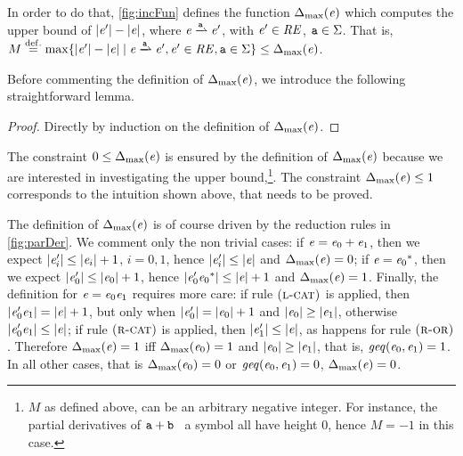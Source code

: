 In order to do that, \cref{fig:incFun} defines the function ${\Delta_{\max}}({\mathit {e}})$ which computes the upper bound of ${\mid}{\mathit {e}'}{\mid}-{\mid}{\mathit {e}}{\mid}$, where
$\re\parDer{\sym}\re'$, with $\mathit {e}'\in\mathit {RE}$, $\mathtt {a}\in\Sigma$.
That is, $M\stackrel{\mathrm{def.}}{=}\max\{\theight{\re'}-\theight{\re} \mid \re\parDer{\sym}\re', \re'\in\reSet, \sym\in\symAlph\}\leq\incFun{\re}$.

Before commenting the definition of ${\Delta_{\max}}({\mathit {e}})$, we introduce the following straightforward lemma.
\begin{proof}
 Directly by induction on the definition of ${\Delta_{\max}}({\mathit {e}})$.
\end{proof}

The constraint $0\leq{\Delta_{\max}}({\mathit {e}})$ is ensured by the definition of ${\Delta_{\max}}({\mathit {e}})$ because we are interested in investigating the upper bound,\footnote{$M$ as defined above, can be an arbitrary negative integer. For instance, the partial derivatives of $\mathtt {a}\mathbin{+}\mathtt {b}$ \wrt~a symbol all have height 0, hence $M=-1$ in this case.}. The constraint ${\Delta_{\max}}({\mathit {e}})\leq 1$ corresponds to the intuition shown above, that needs to be proved.

The definition of ${\Delta_{\max}}({\mathit {e}})$ is of course driven by the reduction rules in \cref{fig:parDer}. We comment only the non trivial cases: if $\mathit {e}=\mathit {e}_0\mathbin{+}\mathit {e}_1$, then we expect ${\mid}{\mathit {e}'_i}{\mid}\leq{\mid}{\ensuremath{\mathit {e}}_i}{\mid}+1$, $i=0,1$,
hence ${\mid}{\mathit {e}'_i}{\mid}\leq{\mid}{\ensuremath{\mathit {e}}}{\mid}$ and ${\Delta_{\max}}({\mathit {e}})=0$;
if $\mathit {e}={\mathit {e}_0}^*$, then we expect ${\mid}{\mathit {e}'_0}{\mid}\leq{\mid}{\ensuremath{\mathit {e}}_0}{\mid}+1$,
hence ${\mid}{\mathit {e}'_0{\mathit {e}_0}^*}{\mid}\leq{\mid}{\ensuremath{\mathit {e}}}{\mid}+1$ and ${\Delta_{\max}}({\mathit {e}})=1$. Finally, the definition for $\mathit {e}=\mathit {e}_0\mathit {e}_1$ requires more care:
if rule $\textsc{({l-cat})}$ is applied, then ${\mid}{\mathit {e}_0'\mathit {e}_1}{\mid}={\mid}{\mathit {e}}{\mid}+1$, but only when ${\mid}{\mathit {e}_0'}{\mid}={\mid}{\mathit {e}_0}{\mid}+1$ and ${\mid}{\mathit {e}_0}{\mid}\geq{\mid}{\ensuremath{\mathit {e}}_1}{\mid}$, otherwise ${\mid}{\mathit {e}_0'\mathit {e}_1}{\mid}\leq{\mid}{\ensuremath{\mathit {e}}}{\mid}$; if rule $\textsc{({r-cat})}$ is applied, then ${\mid}{\mathit {e}'_1}{\mid}\leq{\mid}{\ensuremath{\mathit {e}}}{\mid}$, as happens for rule $\textsc{({r-or})}$. Therefore ${\Delta_{\max}}({\mathit {e}})=1$ iff ${\Delta_{\max}}({\mathit {e}_0})=1$ and ${\mid}{\mathit {e}_0}{\mid}\geq{\mid}{\ensuremath{\mathit {e}}_1}{\mid}$, that is, $\mathit{geq}({\mathit {e}_0},{\mathit {e}_1})=1$. In all other cases, that is ${\Delta_{\max}}({\mathit {e}_0})=0$ or $\mathit{geq}({\mathit {e}_0},{\mathit {e}_1})=0$, ${\Delta_{\max}}({\mathit {e}})=0$.

